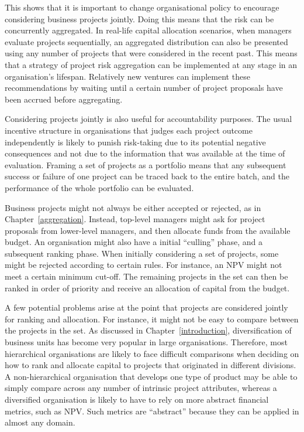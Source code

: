 \documentclass[a4paper, nobind]{templates/ociamthesis}
\theoremstyle{definition}
\theoremstyle{definition}
\theoremstyle{definition}
\theoremstyle{definition}
\theoremstyle{remark}
\begin{document}
This shows that it is important to change organisational policy to encourage
considering business projects jointly. Doing this means that the risk can be
concurrently aggregated. In real-life capital allocation scenarios, when
managers evaluate projects sequentially, an aggregated distribution can also be
presented using any number of projects that were considered in the recent past.
This means that a strategy of project risk aggregation can be implemented at any
stage in an organisation's lifespan. Relatively new ventures can implement these
recommendations by waiting until a certain number of project proposals have been
accrued before aggregating.

Considering projects jointly is also useful for accountability purposes. The
usual incentive structure in organisations that judges each project outcome
independently is likely to punish risk-taking due to its potential negative
consequences and not due to the information that was available at the time of
evaluation. Framing a set of projects as a portfolio means that any subsequent
success or failure of one project can be traced back to the entire batch, and
the performance of the whole portfolio can be evaluated.

Business projects might not always be either accepted or rejected, as in
Chapter~\ref{aggregation}. Instead, top-level managers might ask for project
proposals from lower-level managers, and then allocate funds from the available
budget. An organisation might also have a initial ``culling'' phase, and a
subsequent ranking phase. When initially considering a set of projects, some
might be rejected according to certain rules. For instance, an NPV might not
meet a certain minimum cut-off. The remaining projects in the set can then be
ranked in order of priority and receive an allocation of capital from the
budget.

A few potential problems arise at the point that projects are considered jointly
for ranking and allocation. For instance, it might not be easy to compare
between the projects in the set. As discussed in Chapter~\ref{introduction},
diversification of business units has become very popular in large
organisations. Therefore, most hierarchical organisations are likely to face
difficult comparisons when deciding on how to rank and allocate capital to
projects that originated in different divisions. A non-hierarchical organisation
that develops one type of product may be able to simply compare across any
number of intrinsic project attributes, whereas a diversified organisation is
likely to have to rely on more abstract financial metrics, such as NPV. Such
metrics are ``abstract'' because they can be applied in almost any domain.
\end{document}
